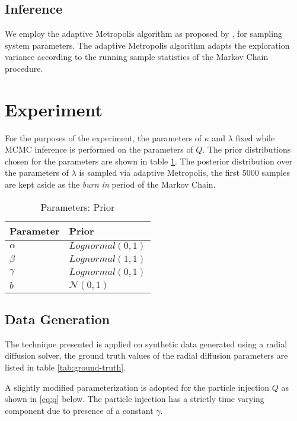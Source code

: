 \subsection{Inference}

We employ the adaptive Metropolis algorithm as proposed by \citet{haario2001}, for sampling
system parameters. The adaptive Metropolis algorithm adapts the exploration variance according
to the running sample statistics of the Markov Chain procedure.


\section{Experiment}\label{sec:exp}

For the purposes of the experiment, the parameters of $\kappa$ and $\lambda$ fixed while MCMC inference 
is performed on the parameters of $Q$. The prior distributions chosen for the parameters 
are shown in table \ref{tab:prior}. The posterior distribution over the parameters of $\lambda$ is 
sampled via adaptive Metropolis, the first 5000 samples are kept aside as the \emph{burn in} period
of the Markov Chain.

\begin{table}[t]
  \caption{Parameters: Prior}
  \label{tab:prior}
  \centering
  \begin{tabular}{ll}
    \hline
    \textbf{Parameter} & \textbf{Prior}\\
    \hline
    $\alpha$ & $Lognormal(0, 1)$ \\
    $\beta$  & $Lognormal(1, 1)$ \\ 
    $\gamma$ & $Lognormal(0, 1)$ \\ 
    $b$ & $\mathcal{N}(0, 1)$ \\
    \hline
  \end{tabular}
\end{table}


\subsection*{Data Generation}

The technique presented is applied on synthetic data generated using a radial diffusion solver, 
the ground truth values of the radial diffusion parameters are listed in table \ref{tab:ground-truth}.

A slightly modified parameterization is adopted for the particle injection $Q$ as shown in \cref{eq:q} below. The particle injection has a strictly time varying component due to presence of a constant $\gamma$.

